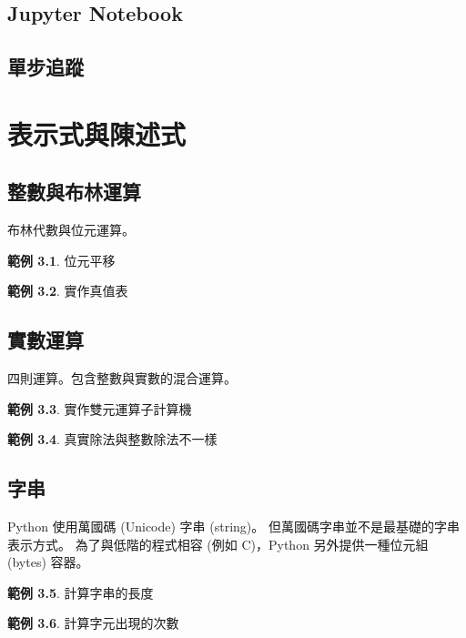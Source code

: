 \documentclass[a4paper,12pt]{book}
\theoremstyle{definition}
\newtheorem{example}{範例}[chapter]
\begin{document}
\section{Jupyter Notebook}

\section{單步追蹤}

\chapter{表示式與陳述式}
%
\label{c:arithmic}

\section{整數與布林運算}

布林代數與位元運算。

\begin{example}
位元平移
\end{example}

\begin{example}
實作真值表
\end{example}

\section{實數運算}

四則運算。包含整數與實數的混合運算。

\begin{example}
實作雙元運算子計算機
\end{example}

\begin{example}
真實除法與整數除法不一樣
\end{example}

\section{字串}

Python 使用萬國碼 (Unicode) 字串 (string)。
但萬國碼字串並不是最基礎的字串表示方式。
為了與低階的程式相容 (例如 C)，Python 另外提供一種位元組 (bytes) 容器。

\begin{example}
計算字串的長度
\end{example}

\begin{example}
計算字元出現的次數
\end{example}
\end{document}
